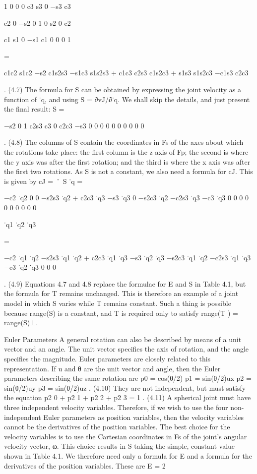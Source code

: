 1 0 0 0 c3 s3 0 −s3 c3

c2 0 −s2 0 1 0 s2 0 c2

c1 s1 0 −s1 c1 0 0 0 1

=

c1c2 s1c2 −s2 c1s2s3 −s1c3 s1s2s3 + c1c3 c2s3 c1s2c3 + s1s3 s1s2c3 −c1s3 c2c3

. (4.7) The formula for S can be obtained by expressing the joint velocity as a function of ˙q, and using S = ∂vJ/∂˙q. We shall skip the details, and just present the final result: S =

−s2 0 1 c2s3 c3 0 c2c3 −s3 0 0 0 0 0 0 0 0 0 0

. (4.8) The columns of S contain the coordinates in Fs of the axes about which the rotations take place: the first column is the z axis of Fp; the second is where the y axis was after the first rotation; and the third is where the x axis was after the first two rotations. As S is not a constant, we also need a formula for cJ. This is given by cJ = ˚ S ˙q =

−c2 ˙q2 0 0 −s2s3 ˙q2 + c2c3 ˙q3 −s3 ˙q3 0 −s2c3 ˙q2 −c2s3 ˙q3 −c3 ˙q3 0 0 0 0 0 0 0 0 0 0

˙q1 ˙q2 ˙q3

=

−c2 ˙q1 ˙q2 −s2s3 ˙q1 ˙q2 + c2c3 ˙q1 ˙q3 −s3 ˙q2 ˙q3 −s2c3 ˙q1 ˙q2 −c2s3 ˙q1 ˙q3 −c3 ˙q2 ˙q3 0 0 0

. (4.9) Equations 4.7 and 4.8 replace the formulae for E and S in Table 4.1, but the formula for T remains unchanged. This is therefore an example of a joint model in which S varies while T remains constant. Such a thing is possible because range(S) is a constant, and T is required only to satisfy range(T ) = range(S)⊥.

Euler Parameters A general rotation can also be described by means of a unit vector and an angle. The unit vector specifies the axis of rotation, and the angle specifies the magnitude. Euler parameters are closely related to this representation. If u and θ are the unit vector and angle, then the Euler parameters describing the same rotation are p0 = cos(θ/2) p1 = sin(θ/2)ux p2 = sin(θ/2)uy p3 = sin(θ/2)uz . (4.10) They are not independent, but must satisfy the equation p2 0 + p2 1 + p2 2 + p2 3 = 1 . (4.11) A spherical joint must have three independent velocity variables. Therefore, if we wish to use the four non-independent Euler parameters as position variables, then the velocity variables cannot be the derivatives of the position variables. The best choice for the velocity variables is to use the Cartesian coordinates in Fs of the joint’s angular velocity vector, ω. This choice results in S taking the simple, constant value shown in Table 4.1. We therefore need only a formula for E and a formula for the derivatives of the position variables. These are E = 2

